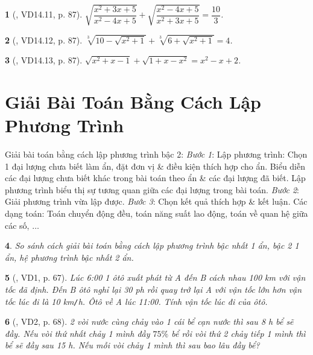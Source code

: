 \documentclass{article}
\newtheorem{baitoan}{}
\begin{document}
\begin{baitoan}[\cite{TLCT_THCS_Toan_9_dai_so}, VD14.11, p. 87]
	$\sqrt{\dfrac{x^2 + 3x + 5}{x^2 - 4x + 5}} + \sqrt{\dfrac{x^2 - 4x + 5}{x^2 + 3x + 5}} = \dfrac{10}{3}$.
\end{baitoan}

\begin{baitoan}[\cite{TLCT_THCS_Toan_9_dai_so}, VD14.12, p. 87]
	$\sqrt[3]{10 - \sqrt{x^2 + 1}} + \sqrt[3]{6 + \sqrt{x^2 + 1}} = 4$.
\end{baitoan}

\begin{baitoan}[\cite{TLCT_THCS_Toan_9_dai_so}, VD14.13, p. 87]
	$\sqrt{x^2 + x - 1} + \sqrt{1 + x - x^2} = x^2 - x + 2$.
\end{baitoan}


\section{Giải Bài Toán Bằng Cách Lập Phương Trình}
 {\sf Giải bài toán bằng cách lập phương trình bậc 2}: \textit{Bước 1}: Lập phương trình: Chọn 1 đại lượng chưa biết làm ẩn, đặt đơn vị \& điều kiện thích hợp cho ẩn. Biểu diễn các đại lượng chưa biết khác trong bài toán theo ẩn \& các đại lượng đã biết. Lập phương trình biểu thị sự tương quan giữa các đại lượng trong bài toán. \textit{Bước 2}: Giải phương trình vừa lập được. \textit{Bước 3}: Chọn kết quả thích hợp \& kết luận.  Các dạng toán: Toán chuyển động đều, toán năng suất lao động, toán về quan hệ giữa các số, $\ldots$

\begin{baitoan}
	So sánh cách giải bài toán bằng cách lập phương trình bậc nhất 1 ẩn, bậc 2 1 ẩn, hệ phương trình bậc nhất 2 ẩn.
\end{baitoan}

\begin{baitoan}[\cite{Binh_boi_duong_Toan_9_tap_2}, VD1, p. 67]
	Lúc {\rm6:00} 1 ôtô xuất phát từ A đến B cách nhau {\rm100 km} với vận tốc đã định. Đến B ôtô nghỉ lại {\rm30 ph} rồi quay trở lại A với vận tốc lớn hơn vận tốc lúc đi là {\rm10 km{\tt/}h}. Ôtô về A lúc {\rm11:00}. Tính vận tốc lúc đi của ôtô.
\end{baitoan}

\begin{baitoan}[\cite{Binh_boi_duong_Toan_9_tap_2}, VD2, p. 68]
	2 vòi nước cùng chảy vào 1 cái bể cạn nước thì sau {\rm8 h} bể sẽ đầy. Nếu vòi thứ nhất chảy 1 mình đầy $75\%$ bể rồi vòi thứ 2 chảy tiếp 1 mình thì bể sẽ đầy sau {\rm15 h}. Nếu mỗi vòi chảy 1 mình thì sau bao lâu đầy bể?
\end{baitoan}
\end{document}
